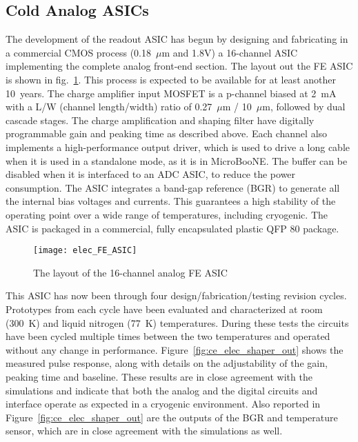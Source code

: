 %
\subsection{Cold Analog ASICs}
\label{subsec:fe_CMOS_analog}

The development of the readout ASIC has begun by designing and fabricating in a commercial CMOS
process (0.18~$\mu$m and 1.8V) a 16-channel ASIC implementing the complete analog front-end section.
The layout out the FE ASIC is shown in fig.~\ref{fig:elec_FE_ASIC}.  %
This process is expected to be available for at least another 10~years. 
The charge amplifier input MOSFET is a p-channel biased at 2~mA with a L/W (channel length/width) ratio
of 0.27~$\mu$m / 10~$\mu$m, followed by dual cascade stages.
The charge amplification and shaping filter have
digitally programmable gain and peaking time as described above.
Each channel also implements a high-performance output driver,
which is used to drive a long cable when it is used in a standalone mode, as it is in MicroBooNE.
The buffer can be disabled when it is interfaced to an ADC ASIC, to reduce the power consumption.
The ASIC integrates a band-gap reference (BGR) to generate all the internal bias voltages and currents.
This guarantees a high stability of the operating point over a wide range of
temperatures, including cryogenic.
The ASIC is packaged in a commercial, fully encapsulated plastic QFP 80 package.

\begin{figure}[htbp]
\centering
\texttt{[image: elec\_FE\_ASIC]} %
\caption{The layout of the 16-channel analog FE ASIC}
\label{fig:elec_FE_ASIC}
\end{figure}

This ASIC has now been through four design/fabrication/testing revision cycles.
Prototypes from each cycle have been evaluated and characterized at room (300~K) and liquid nitrogen (77~K) temperatures.
During these tests the circuits have been cycled multiple times
between the two temperatures and operated without any change in performance.
Figure~\ref{fig:ce_elec_shaper_out} shows the measured pulse response, along with
details on the adjustability of the gain, peaking time and baseline.
These results are in close agreement with the simulations and indicate
that both the analog and the digital circuits and interface operate as
expected in a cryogenic environment.
Also reported in Figure~\ref{fig:ce_elec_shaper_out} are the outputs of the BGR and temperature sensor,
which are in close agreement with the simulations as well.

